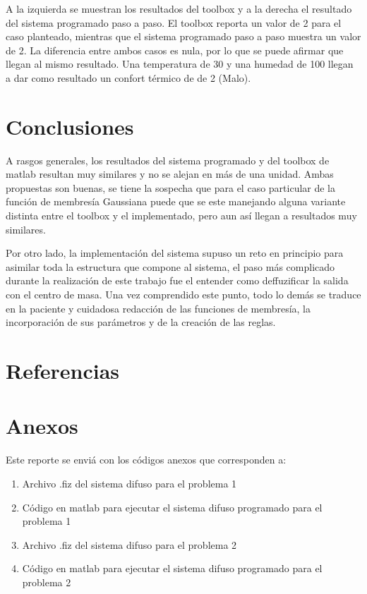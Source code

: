 \documentclass[11pt, letterpaper]{article}
\begin{document}
A la izquierda se muestran los resultados del toolbox y a la derecha el resultado del sistema programado paso a paso. El toolbox reporta un valor de 2 para el caso planteado, mientras que el sistema programado paso a paso muestra un valor de 2. La diferencia entre ambos casos es nula, por lo que se puede afirmar que llegan al mismo resultado. Una temperatura de 30 y una humedad de 100 llegan a dar como resultado un confort térmico de de 2 (Malo).

\newpage


\section{Conclusiones}

A rasgos generales, los resultados del sistema programado y del toolbox de matlab resultan muy similares y no se alejan en más de una unidad.
Ambas propuestas son buenas, se tiene la sospecha que para el caso particular de la función de membresía Gaussiana puede que se este manejando alguna variante distinta entre el toolbox y el implementado, pero aun así llegan a resultados muy similares.

Por otro lado, la implementación del sistema supuso un reto en principio para asimilar toda la estructura que compone al sistema, el paso más complicado durante la realización de este trabajo fue el entender como deffuzificar la salida con el centro de masa. Una vez comprendido este punto, todo lo demás se traduce en la paciente y cuidadosa redacción de las funciones de membresía, la incorporación de sus parámetros y de la creación de las reglas.


\newpage

\section{Referencias}


\newpage

\section{Anexos}

Este reporte se enviá con los códigos anexos que corresponden a:

\begin{enumerate}
	\item Archivo .fiz del sistema difuso para el problema 1 
	\item Código en matlab para ejecutar el sistema difuso programado para el problema 1
	\item Archivo .fiz del sistema difuso para el problema 2
	\item Código en matlab para ejecutar el sistema difuso programado para el problema 2
\end{enumerate}
\end{document}
